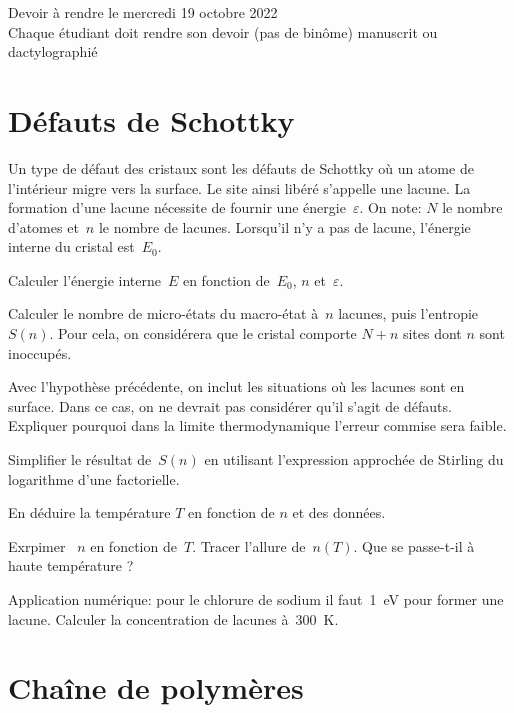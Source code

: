 \documentclass[utf8, 11pt]{feuille}
\begin{document}
\begin{center}
Devoir à rendre le mercredi 19 octobre 2022 \\
Chaque étudiant doit rendre son devoir (pas de binôme) manuscrit ou dactylographié
\end{center}

\section{Défauts de Schottky}

Un type de défaut des cristaux sont les défauts de Schottky où un
atome de l'intérieur migre vers la surface. Le site ainsi libéré s'appelle une lacune.
La formation d'une lacune nécessite de fournir une énergie~$\varepsilon$.
On note: $N$ le nombre d'atomes et~$n$ le nombre de lacunes. Lorsqu'il n'y a pas de lacune,
l'énergie interne du cristal est~$E_0$.

\question
Calculer l'énergie interne~$E$ en fonction de~$E_0$, $n$
et~$\varepsilon$.


\question
Calculer le nombre de micro-états du macro-état à~$n$ lacunes, puis l'entropie~$S(n)$. Pour cela, on considérera que le cristal comporte $N+n$ sites dont $n$ sont inoccupés.

\question Avec l'hypothèse précédente, on inclut les situations où les lacunes sont en surface. Dans ce cas, on ne devrait pas considérer qu'il s'agit de défauts. Expliquer pourquoi dans la limite thermodynamique l'erreur commise sera faible.


\question
Simplifier le résultat de~$S(n)$ en utilisant l'expression approchée
de Stirling du logarithme d'une factorielle.


\question
En déduire la température $T$ en fonction de $n$ et des données.

\question
Exrpimer ~$n$ en fonction de~$T$. Tracer
l'allure de~$n(T)$. Que se passe-t-il à haute température ?


\question
Application numérique: pour le chlorure de sodium il faut~1~eV pour
former une lacune. Calculer la concentration de lacunes à~300~K.


\section{Cha\^ine de polymères}
\end{document}
